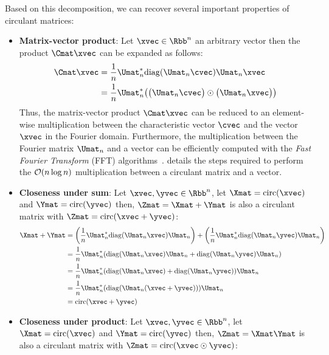 \noindent
Based on this decomposition, we can recover several important properties of circulant matrices:
\begin{itemize}[leftmargin=13pt]
  \item \textbf{Matrix-vector product}: Let $\xvec \in \Rbb^n$ an arbitrary vector then the product $\Cmat \xvec$ can be expanded as follows:
  \begin{align}
    \Cmat \xvec &= \frac{1}{n} \Umat_n^* \diag(\Umat_n \cvec) \Umat_n \xvec  \\
    &= \frac{1}{n} \Umat_n^* \left( \big(\Umat_n \cvec \big) \odot \big( \Umat_n \xvec \big) \right)
  \end{align}
  Thus, the matrix-vector product $\Cmat \xvec$ can be reduced to an element-wise multiplication between the characteristic vector $\cvec$ and the vector $\xvec$ in the Fourier domain.
  Furthermore, the multiplication between the Fourier matrix $\Umat_n$ and a vector can be efficiently computed with the \emph{Fast Fourier Transform} (FFT) algorithms~\cite{cooley1965algorithm}.
   details the steps required to perform the $\mathcal{O}(n \log n)$ multiplication between  a circulant matrix and a vector.
\item \textbf{Closeness under sum}: Let $\xvec, \yvec \in \Rbb^n$, let $\Xmat= \circulant(\xvec)$ and $\Ymat = \circulant(\yvec)$ then, $\Zmat  = \Xmat + \Ymat$ is also a circulant matrix with $\Zmat = \circulant(\xvec + \yvec)$:
    \begin{align}
      \Xmat + \Ymat &= \left( \frac{1}{n} \Umat_n^* \diag(\Umat_n \xvec) \Umat_n \right) + \left( \frac{1}{n} \Umat_n^* \diag(\Umat_n \yvec) \Umat_n \right) \\
      &= \frac{1}{n}  \Umat_n^* \left( \diag(\Umat_n \xvec) \Umat_n  + \diag(\Umat_n \yvec) \Umat_n \right) \\
      &= \frac{1}{n}  \Umat_n^* \left( \diag(\Umat_n \xvec) + \diag(\Umat_n \yvec) \right) \Umat_n  \\
      &= \frac{1}{n}  \Umat_n^* \left( \diag(\Umat_n (\xvec + \yvec)) \right) \Umat_n  \\
      &= \circulant(\xvec + \yvec)
    \end{align}
  \item \textbf{Closeness under product}: Let $\xvec, \yvec \in \Rbb^n$, let $\Xmat= \circulant(\xvec)$ and $\Ymat = \circulant(\yvec)$ then, $\Zmat  = \Xmat \Ymat$ is also a circulant matrix with $\Zmat = \circulant(\xvec \odot \yvec)$:
    \begin{align}

\end{align}
\end{itemize}
